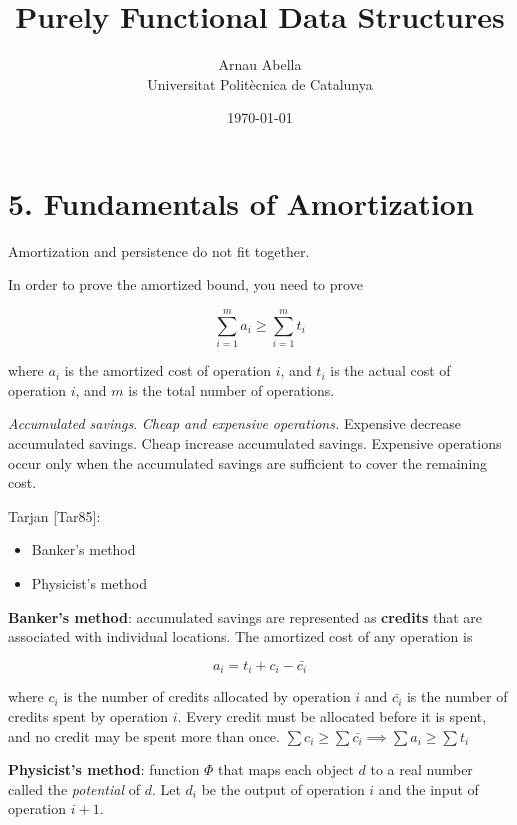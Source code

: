 \documentclass[12pt, a4paper]{article} %
\title{%
  Purely Functional Data Structures
}
\author{%
  Arnau Abella \\
  \large{Universitat Polit\`ecnica de Catalunya}
}
\date{\today}
\theoremstyle{definition}
\begin{document}
\maketitle

\section*{5. Fundamentals of Amortization}

Amortization and persistence do not fit together.

In order to prove the amortized bound, you need to prove

\begin{equation}
  \sum_{i=1}^m a_i \geq \sum_{i=1}^m t_i
\end{equation}

where $a_i$ is the amortized cost of operation $i$, and $t_i$ is the actual cost of operation $i$, and $m$ is the total number of operations.

\textit{Accumulated savings}. \textit{Cheap and expensive operations.} Expensive decrease accumulated savings. Cheap increase accumulated savings. Expensive operations occur only when the accumulated savings are sufficient to cover the remaining cost.

Tarjan [Tar85]:

\begin{itemize}
  \item Banker's method
  \item Physicist's method
\end{itemize}

\textbf{Banker's method}: accumulated savings are represented as \textbf{credits} that are associated with individual locations. The amortized cost of any operation is

\begin{equation}
  a_i = t_i + c_i - \bar{c_i}
\end{equation}

where $c_i$ is the number of credits allocated by operation $i$ and $\bar{c_i}$ is the number of credits spent by operation $i$. Every credit must be allocated before it is spent, and no credit may be spent more than once. $\sum c_i \geq \sum \bar{c_i} \implies \sum a_i \geq \sum t_i$

\textbf{Physicist's method}: function $\Phi$ that maps each object $d$ to a real number called the \textit{potential} of $d$. Let $d_i$ be the output of operation $i$ and the input of operation $i+1$.














\end{document}
